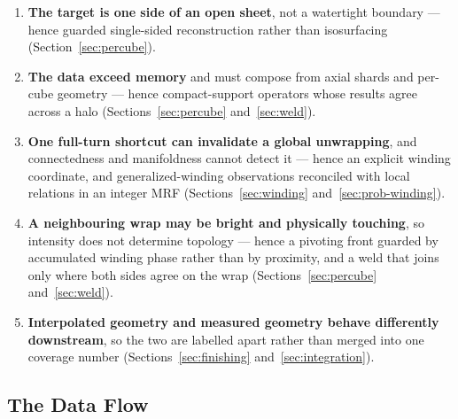 \begin{enumerate}
  \setlength{\itemsep}{2pt}
  \item \textbf{The target is one side of an open sheet}, not a watertight boundary --- hence guarded single-sided reconstruction rather than isosurfacing (Section~\ref{sec:percube}).
  \item \textbf{The data exceed memory} and must compose from axial shards and per-cube geometry --- hence compact-support operators whose results agree across a halo (Sections~\ref{sec:percube} and~\ref{sec:weld}).
  \item \textbf{One full-turn shortcut can invalidate a global unwrapping}, and connectedness and manifoldness cannot detect it --- hence an explicit winding coordinate, and generalized-winding observations reconciled with local relations in an integer MRF (Sections~\ref{sec:winding} and~\ref{sec:prob-winding}).
  \item \textbf{A neighbouring wrap may be bright and physically touching}, so intensity does not determine topology --- hence a pivoting front guarded by accumulated winding phase rather than by proximity, and a weld that joins only where both sides agree on the wrap (Sections~\ref{sec:percube} and~\ref{sec:weld}).
  \item \textbf{Interpolated geometry and measured geometry behave differently downstream}, so the two are labelled apart rather than merged into one coverage number (Sections~\ref{sec:finishing} and~\ref{sec:integration}).
\end{enumerate}

\subsection{The Data Flow}
\label{sec:dataflow-text}

